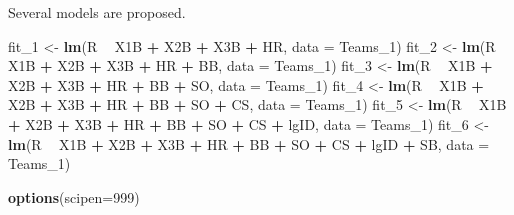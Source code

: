 \documentclass[]{article}
\newenvironment{Shaded}{\begin{snugshade}}{\end{snugshade}}
\newcommand{\DataTypeTok}[1]{\textcolor[rgb]{0.13,0.29,0.53}{#1}}
\newcommand{\DecValTok}[1]{\textcolor[rgb]{0.00,0.00,0.81}{#1}}
\newcommand{\KeywordTok}[1]{\textcolor[rgb]{0.13,0.29,0.53}{\textbf{#1}}}
\newcommand{\NormalTok}[1]{#1}
\newcommand{\OperatorTok}[1]{\textcolor[rgb]{0.81,0.36,0.00}{\textbf{#1}}}
\newcommand{\StringTok}[1]{\textcolor[rgb]{0.31,0.60,0.02}{#1}}
\begin{document}
Several models are proposed.

\begin{Shaded}
\begin{Highlighting}[]
\NormalTok{fit_}\DecValTok{1}\NormalTok{ <-}\StringTok{ }\KeywordTok{lm}\NormalTok{(R }\OperatorTok{~}\StringTok{ }\NormalTok{X1B }\OperatorTok{+}\StringTok{ }\NormalTok{X2B }\OperatorTok{+}\StringTok{ }\NormalTok{X3B }\OperatorTok{+}\StringTok{ }\NormalTok{HR, }\DataTypeTok{data =}\NormalTok{ Teams_}\DecValTok{1}\NormalTok{)}
\NormalTok{fit_}\DecValTok{2}\NormalTok{ <-}\StringTok{ }\KeywordTok{lm}\NormalTok{(R }\OperatorTok{~}\StringTok{ }\NormalTok{X1B }\OperatorTok{+}\StringTok{ }\NormalTok{X2B }\OperatorTok{+}\StringTok{ }\NormalTok{X3B }\OperatorTok{+}\StringTok{ }\NormalTok{HR }\OperatorTok{+}\StringTok{ }\NormalTok{BB, }\DataTypeTok{data =}\NormalTok{ Teams_}\DecValTok{1}\NormalTok{)}
\NormalTok{fit_}\DecValTok{3}\NormalTok{ <-}\StringTok{ }\KeywordTok{lm}\NormalTok{(R }\OperatorTok{~}\StringTok{ }\NormalTok{X1B }\OperatorTok{+}\StringTok{ }\NormalTok{X2B }\OperatorTok{+}\StringTok{ }\NormalTok{X3B }\OperatorTok{+}\StringTok{ }\NormalTok{HR }\OperatorTok{+}\StringTok{ }\NormalTok{BB }\OperatorTok{+}\StringTok{ }\NormalTok{SO, }\DataTypeTok{data =}\NormalTok{ Teams_}\DecValTok{1}\NormalTok{)}
\NormalTok{fit_}\DecValTok{4}\NormalTok{ <-}\StringTok{ }\KeywordTok{lm}\NormalTok{(R }\OperatorTok{~}\StringTok{ }\NormalTok{X1B }\OperatorTok{+}\StringTok{ }\NormalTok{X2B }\OperatorTok{+}\StringTok{ }\NormalTok{X3B }\OperatorTok{+}\StringTok{ }\NormalTok{HR }\OperatorTok{+}\StringTok{ }\NormalTok{BB }\OperatorTok{+}\StringTok{ }\NormalTok{SO }\OperatorTok{+}\StringTok{ }\NormalTok{CS, }\DataTypeTok{data =}\NormalTok{ Teams_}\DecValTok{1}\NormalTok{)}
\NormalTok{fit_}\DecValTok{5}\NormalTok{ <-}\StringTok{ }\KeywordTok{lm}\NormalTok{(R }\OperatorTok{~}\StringTok{ }\NormalTok{X1B }\OperatorTok{+}\StringTok{ }\NormalTok{X2B }\OperatorTok{+}\StringTok{ }\NormalTok{X3B }\OperatorTok{+}\StringTok{ }\NormalTok{HR }\OperatorTok{+}\StringTok{ }\NormalTok{BB }\OperatorTok{+}\StringTok{ }\NormalTok{SO }\OperatorTok{+}\StringTok{ }\NormalTok{CS }\OperatorTok{+}\StringTok{ }\NormalTok{lgID, }\DataTypeTok{data =}\NormalTok{ Teams_}\DecValTok{1}\NormalTok{)}
\NormalTok{fit_}\DecValTok{6}\NormalTok{ <-}\StringTok{ }\KeywordTok{lm}\NormalTok{(R }\OperatorTok{~}\StringTok{ }\NormalTok{X1B }\OperatorTok{+}\StringTok{ }\NormalTok{X2B }\OperatorTok{+}\StringTok{ }\NormalTok{X3B }\OperatorTok{+}\StringTok{ }\NormalTok{HR }\OperatorTok{+}\StringTok{ }\NormalTok{BB }\OperatorTok{+}\StringTok{ }\NormalTok{SO }\OperatorTok{+}\StringTok{ }\NormalTok{CS }\OperatorTok{+}\StringTok{ }\NormalTok{lgID }\OperatorTok{+}\StringTok{ }\NormalTok{SB, }\DataTypeTok{data =}\NormalTok{ Teams_}\DecValTok{1}\NormalTok{)}

\KeywordTok{options}\NormalTok{(}\DataTypeTok{scipen=}\DecValTok{999}\NormalTok{)}
\end{Highlighting}
\end{Shaded}
\end{document}
